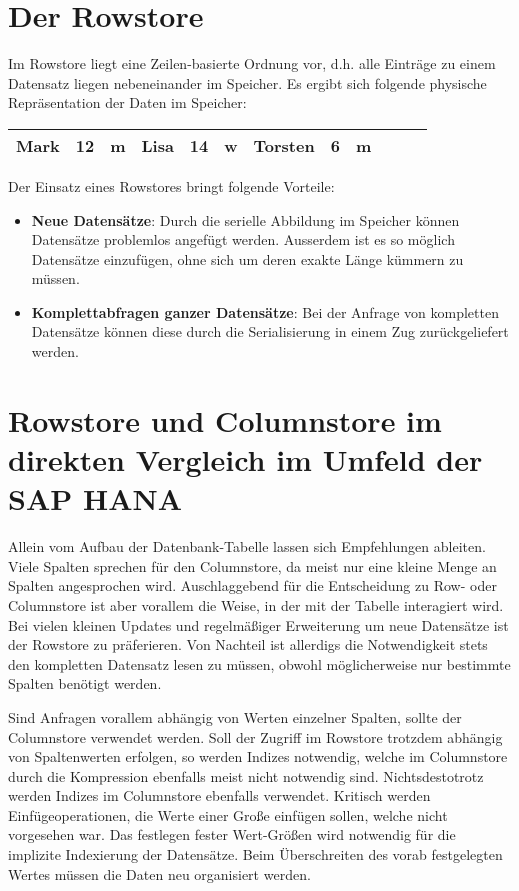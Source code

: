 \section{Der Rowstore}
Im Rowstore liegt eine Zeilen-basierte Ordnung vor, d.h. alle Einträge zu einem Datensatz liegen nebeneinander im Speicher. Es ergibt sich folgende physische Repräsentation der Daten im Speicher:

\begin{center}
    \begin{tabular}{ | l | l | l | l | l | l | l | l | l | l | l | l |}
    \hline
    Mark & 12 & m & Lisa & 14 & w & Torsten & 6 & m \\ \hline
    \end{tabular}
\end{center}

Der Einsatz eines Rowstores bringt folgende Vorteile: 

\begin{itemize}
    \item \textbf{Neue Datensätze}: Durch die serielle Abbildung im Speicher können Datensätze problemlos angefügt werden. Ausserdem ist es so möglich Datensätze einzufügen, ohne sich um deren exakte Länge kümmern zu müssen.
    \item \textbf{Komplettabfragen ganzer Datensätze}: Bei der Anfrage von kompletten Datensätze können diese durch die Serialisierung in einem Zug zurückgeliefert werden. 
\end{itemize}

\section{Rowstore und Columnstore im direkten Vergleich im Umfeld der SAP HANA}

Allein vom Aufbau der Datenbank-Tabelle lassen sich Empfehlungen ableiten. Viele Spalten sprechen für den Columnstore, da meist nur eine kleine Menge an Spalten angesprochen wird. 
Auschlaggebend für die Entscheidung zu Row- oder Columnstore ist aber vorallem die Weise, in der mit der Tabelle interagiert wird. Bei vielen kleinen Updates und regelmäßiger Erweiterung um neue Datensätze ist der Rowstore zu präferieren. Von Nachteil ist allerdigs die Notwendigkeit stets den kompletten Datensatz lesen zu müssen, obwohl möglicherweise nur bestimmte Spalten benötigt werden. 

Sind Anfragen vorallem abhängig von Werten einzelner Spalten, sollte der Columnstore verwendet werden. Soll der Zugriff im Rowstore trotzdem abhängig von Spaltenwerten erfolgen, so werden Indizes notwendig, welche im Columnstore durch die Kompression ebenfalls meist nicht notwendig sind. Nichtsdestotrotz werden Indizes im Columnstore ebenfalls verwendet. Kritisch werden Einfügeoperationen, die Werte einer Große einfügen sollen, welche nicht vorgesehen war. Das festlegen fester Wert-Größen wird notwendig für die implizite Indexierung der Datensätze. Beim Überschreiten des vorab festgelegten Wertes müssen die Daten neu organisiert werden. 

